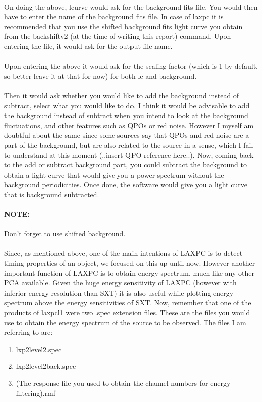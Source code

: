 \documentclass[a4paper,twoside]{report}
\numberwithin{equation}{section}
\begin{document}
\paragraph{}
On doing the above, lcurve would ask for the background fits file. You would then have to enter the name of the background fits file. In case of laxpc it is recommended that you use the shifted background fits light curve you obtain from the backshiftv2 (at the time of writing this report) command. Upon entering the file, it would ask for the output file name. 
\paragraph{}
Upon entering the above it would ask for the scaling factor (which is 1 by default, so better leave it at that for now) for both lc and background. 
\paragraph{}
Then it would ask whether you would like to add the background instead of subtract, select what you would like to do. I think it would be advisable to add the background instead of subtract when you intend to look at the background fluctuations, and other features such as QPOs or red noise. However I myself am doubtful about the same since some sources say that QPOs and red noise are a part of the background, but are also related to the source in a sense, which I fail to understand at this moment (..insert QPO reference here..). Now, coming back to the add or subtract background part, you could subtract the background to obtain a light curve that would give you a power spectrum without the background periodicities. Once done, the software would give you a light curve that is background subtracted. 
\paragraph{NOTE:} 
Don't forget to use shifted background. 
\paragraph{}
Since, as mentioned above, one of the main intentions of LAXPC is to detect timing properties of an object, we focused on this up until now. However another important function of LAXPC is to obtain energy spectrum, much like any other PCA available. Given the huge energy sensitivity of LAXPC (however with inferior energy resolution than SXT) it is also useful while plotting energy spectrum above the energy sensitivities of SXT. Now, remember that one of the products of laxpcl1 were two .spec extension files. These are the files you would use to obtain the energy spectrum of the source to be observed. The files I am referring to are:
\begin{enumerate}
\item lxp2level2.spec
\item lxp2level2back.spec
\item (The response file you used to obtain the channel numbers for energy filtering).rmf
\end{enumerate}
\end{document}
